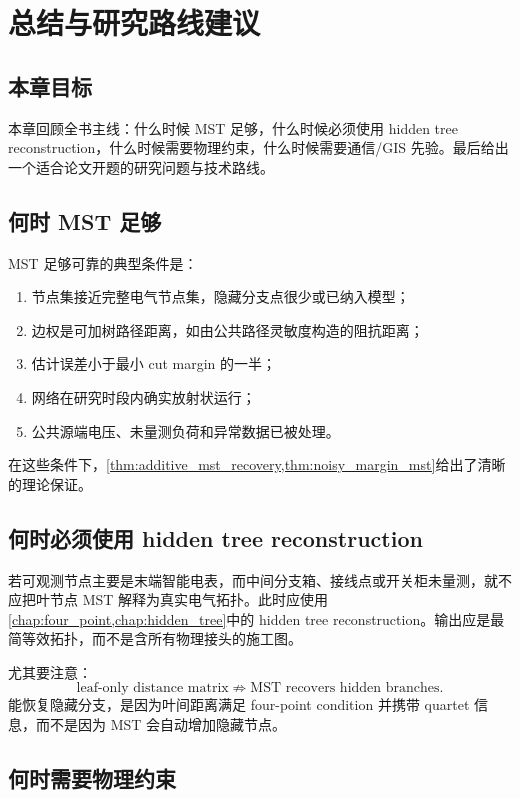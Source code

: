 \chapter{总结与研究路线建议}
\label{chap:summary}

\section*{本章目标}
本章回顾全书主线：什么时候 MST 足够，什么时候必须使用 hidden tree reconstruction，什么时候需要物理约束，什么时候需要通信/GIS 先验。最后给出一个适合论文开题的研究问题与技术路线。

\section{何时 MST 足够}

MST 足够可靠的典型条件是：
\begin{enumerate}[label=(\arabic*)]
  \item 节点集接近完整电气节点集，隐藏分支点很少或已纳入模型；
  \item 边权是可加树路径距离，如由公共路径灵敏度构造的阻抗距离；
  \item 估计误差小于最小 cut margin 的一半；
  \item 网络在研究时段内确实放射状运行；
  \item 公共源端电压、未量测负荷和异常数据已被处理。
\end{enumerate}
在这些条件下，\cref{thm:additive_mst_recovery,thm:noisy_margin_mst}给出了清晰的理论保证。

\section{何时必须使用 hidden tree reconstruction}

若可观测节点主要是末端智能电表，而中间分支箱、接线点或开关柜未量测，就不应把叶节点 MST 解释为真实电气拓扑。此时应使用\cref{chap:four_point,chap:hidden_tree}中的 hidden tree reconstruction。输出应是最简等效拓扑，而不是含所有物理接头的施工图。

尤其要注意：
\begin{equation}
  \text{leaf-only distance matrix} \not\Rightarrow
  \text{MST recovers hidden branches}.
\end{equation}
能恢复隐藏分支，是因为叶间距离满足 four-point condition 并携带 quartet 信息，而不是因为 MST 会自动增加隐藏节点。

\section{何时需要物理约束}

